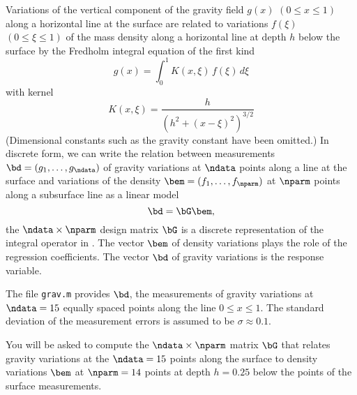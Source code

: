 \documentclass[11pt,titlepage,fleqn]{article}
\newcommand{\numdataG}{15}
\newcommand{\numparmG}{14}
\newcommand{\mv}{\xi}  %
\newcommand{\dv}{x}  %
\newcommand{\dep}{h}
\begin{document}
Variations of the vertical component of the gravity field $g(\dv)$ $(0 \le \dv \le 1)$ along a horizontal line at the surface are related to variations $f(\mv)$ $(0 \le \mv \le 1)$ of the mass density along a horizontal line at depth $\dep$ below the surface by the Fredholm integral equation of the first kind \citep[\eg][eq.~1.31]{AsterE2}
%
\begin{equation}
g(\dv) = \int_0^1 K(\dv,\mv)\,f(\mv)\,d\mv
\label{gs}
\end{equation}
%
with kernel
%
\begin{equation}
K(\dv,\mv) = \frac{\dep}{\left(\dep^2 + (\dv-\mv)^2\right)^{3/2}}
\label{Kxy}
\end{equation}
%
(Dimensional constants such as the gravity constant have been omitted.) In discrete form, we can write the relation between measurements $\bd = (g_1,\ldots,g_\ndata)$ of gravity variations at $\ndata$ points along a line at the surface and variations of the density $\bem = (f_1,\ldots,f_\nparm)$ at $\nparm$ points along a subsurface line as a linear model
%
\begin{equation}
\bd = \bG\bem,
\end{equation}
%
the $\ndata \times \nparm$ design matrix $\bG$ is a discrete representation of the integral operator in . The vector $\bem$ of density variations plays the role of the regression coefficients. The vector $\bd$ of gravity variations is the response variable.

The file \verb+grav.m+ provides $\bd$, the measurements of gravity variations at $\ndata = \numdataG$ equally spaced points along the line $0 \le \dv \le 1$. The standard deviation of the measurement errors is assumed to be $\sigma \approx 0.1$.

You will be asked to compute
the $\ndata \times \nparm$ matrix $\bG$ that relates gravity variations at the $\ndata=\numdataG$ points along the surface to density variations $\bem$ at $\nparm = \numparmG$ points at depth $\dep = 0.25$ below the points of the surface measurements. 


\end{document}
